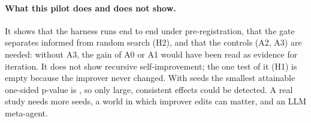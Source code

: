 \paragraph{What this pilot does and does not show.} It shows that the harness runs end to end under pre-registration, that the gate separates informed from random search (H2), and that the controls (A2, A3) are needed: without A3, the gain of A0 or A1 would have been read as evidence for iteration. It does not show recursive self-improvement; the one test of it (H1) is empty because the improver never changed. With \NSeeds{} seeds the smallest attainable one-sided p-value is \MinP{}, so only large, consistent effects could be detected. A real study needs more seeds, a world in which improver edits can matter, and an LLM meta-agent.

